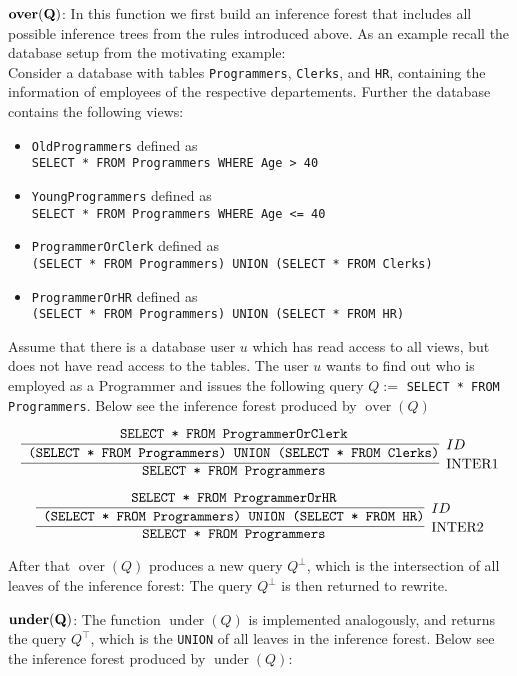 \smallskip
\noindent
{$\mathbf{ \mathrm{\bf over}(Q)}$:}
%
In this function we first build an inference forest that includes all possible inference trees from the rules introduced above.
%
As an example recall the database setup from the motivating example:
\\
Consider a database with tables \texttt{Programmers}, \texttt{Clerks}, and \texttt{HR}, containing the information of employees of the respective departements.
%
Further the database contains the following views:
\begin{itemize}
	\item \texttt{OldProgrammers} defined as \\ \texttt{SELECT * FROM Programmers WHERE Age > 40}
	\item \texttt{YoungProgrammers} defined as \\ \texttt{SELECT * FROM Programmers WHERE Age <= 40}
	\item \texttt{ProgrammerOrClerk} defined as \\ \texttt{(SELECT * FROM Programmers) UNION (SELECT * FROM Clerks)}
	\item \texttt{ProgrammerOrHR} defined as \\ \texttt{(SELECT * FROM Programmers) UNION (SELECT * FROM HR)}
\end{itemize}
%
Assume that there is a database user $u$ which has read access to all views, but does not have read access to the tables.
%
The user $u$ wants to find out who is employed as a Programmer and issues the following query $Q := $ \texttt{SELECT * FROM Programmers}. 
%
Below see the inference forest produced by $\operatorname{over}(Q)$

\[
\infer[\text{INTER1}]
	{\text{\texttt{ SELECT * FROM Programmers}}}
	{
		\infer[ID]
		{\text{\texttt{ (SELECT * FROM Programmers) UNION (SELECT * FROM Clerks)}}}
		{\text{\texttt{ SELECT * FROM ProgrammerOrClerk}}}
	}
\]

\[
\infer[\text{INTER2}]
	{\text{\texttt{ SELECT * FROM Programmers}}}
	{
		\infer[ID]
		{\text{\texttt{ (SELECT * FROM Programmers) UNION (SELECT * FROM HR)}}}
		{\text{\texttt{ SELECT * FROM ProgrammerOrHR}}}
	}	
\]

After that $\operatorname{over}(Q)$ produces a new query $Q^\bot$, which is the intersection of all leaves of the inference forest: 
%
The query $Q^\bot$ is then returned to rewrite.

\smallskip
\noindent
{$\mathbf{ \mathrm{\bf under}(Q)}$:}
The function $\operatorname{under}(Q)$ is implemented analogously, and returns the query $Q^\top$, which is the \texttt{UNION} of all leaves in the inference forest. Below see the inference forest produced by $\operatorname{under}(Q)$:

